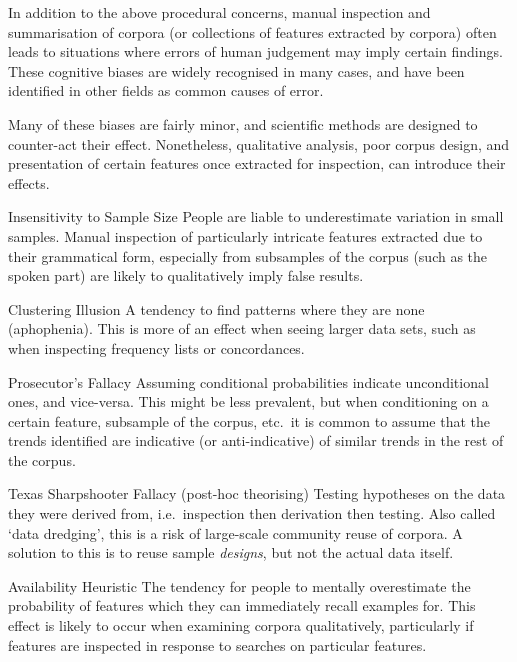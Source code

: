 In addition to the above procedural concerns, manual inspection and summarisation of corpora (or collections of features extracted by corpora) often leads to situations where errors of human judgement may imply certain findings.  These cognitive biases are widely recognised in many cases, and have been identified in other fields as common causes of error\cite{jain2012does,lieberman2009type}.

Many of these biases are fairly minor, and scientific methods are designed to counter-act their effect.  Nonetheless, qualitative analysis, poor corpus design, and presentation of certain features once extracted for inspection, can introduce their effects.



\begin{itemizeTitle}
    \item[Insensitivity to Sample Size] People are liable to underestimate variation in small samples.  Manual inspection of particularly intricate features extracted due to their grammatical form, especially from subsamples of the corpus (such as the spoken part) are likely to qualitatively imply false results\cite{rabin2000inference}.

    \item[Clustering Illusion] A tendency to find patterns where they are none (aphophenia).  This is more of an effect when seeing larger data sets, such as when inspecting frequency lists or concordances.

    \item[Prosecutor's Fallacy] Assuming conditional probabilities indicate unconditional ones, and vice-versa.  This might be less prevalent, but when conditioning on a certain feature, subsample of the corpus, etc.\ it is common to assume that the trends identified are indicative (or anti-indicative) of similar trends in the rest of the corpus.

    \item[Texas Sharpshooter Fallacy (post-hoc theorising)] Testing hypotheses on the data they were derived from, i.e.\ inspection then derivation then testing.  Also called `data dredging', this is a risk of large-scale community reuse of corpora.  A solution to this is to reuse sample \textsl{designs}, but not the actual data itself.

    \item[Availability Heuristic] The tendency for people to mentally overestimate the probability of features which they can immediately recall examples for\cite{tversky1973availability,schafer2014focused}.  This effect is likely to occur when examining corpora qualitatively, particularly if features are inspected in response to searches on particular features.
\end{itemizeTitle}


